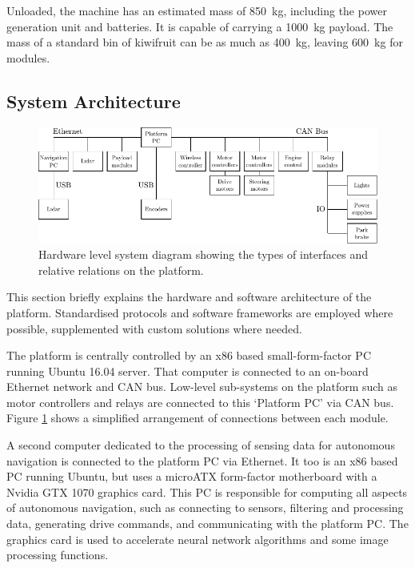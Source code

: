 \documentclass[preprint,authoryear,12pt]{elsarticle}
\begin{document}
        Unloaded, the machine has an estimated mass of \SI{850}{\kilo\gram}, including the power generation unit and batteries.
        It is capable of carrying a \SI{1000}{\kilo\gram} payload.
        The mass of a standard bin of kiwifruit can be as much as \SI{400}{\kilo\gram}, leaving \SI{600}{\kilo\gram} for modules.

    \subsection{System Architecture}
    \label{sect:architecture}

        \begin{figure}[htb]
            \centering
            \includegraphics[width=\linewidth]{imgs/system_diagram/diagram_v3.pdf}
            \caption{Hardware level system diagram showing the types of interfaces and relative relations on the platform.}
            \label{fig:system_diagram}
        \end{figure}

        This section briefly explains the hardware and software architecture of the platform.
        Standardised protocols and software frameworks are employed where possible, supplemented with custom solutions where needed.

        The platform is centrally controlled by an x86 based small-form-factor PC running Ubuntu 16.04 server.
        That computer is connected to an on-board Ethernet network and CAN bus.
        Low-level sub-systems on the platform such as motor controllers and relays are connected to this `Platform PC' via CAN bus.
        Figure \ref{fig:system_diagram} shows a simplified arrangement of connections between each module.

        A second computer dedicated to the processing of sensing data for autonomous navigation is connected to the platform PC via Ethernet.
        It too is an x86 based PC running Ubuntu, but uses a microATX form-factor motherboard with a Nvidia GTX 1070 graphics card.
        This PC is responsible for computing all aspects of autonomous navigation, such as connecting to sensors, filtering and processing data, generating drive commands, and communicating with the platform PC.
        The graphics card is used to accelerate neural network algorithms and some image processing functions.
\end{document}
